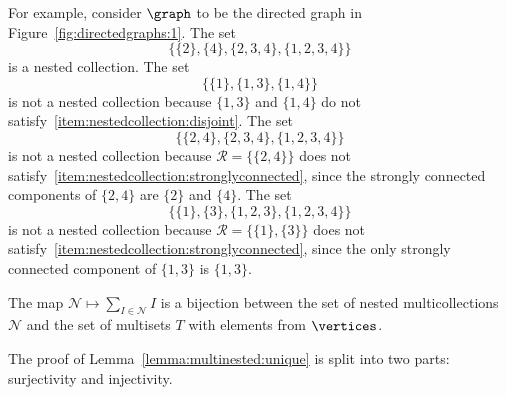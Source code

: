 For example,
consider \(\graph\) to be the directed graph in Figure~\ref{fig:directedgraphs:1}.
The set
\begin{equation*}
    \{
        \{2\},
        \{4\},
        \{2, 3, 4\},
        \{1, 2, 3, 4\}
    \}
\end{equation*} 
is a nested collection.
The set
\begin{equation*}
    \{
        \{1\},
        \{1, 3\},
        \{1, 4\}
    \}
\end{equation*}
is not a nested collection because \(\{1, 3\}\) and \(\{1, 4\}\) do not satisfy~\ref{item:nestedcollection:disjoint}.
The set
\begin{equation*}
    \{
        \{2, 4\},
        \{2, 3, 4\},
        \{1, 2, 3, 4\}
    \}
\end{equation*}
is not a nested collection because \(\mathcal{R} = \{ \{2, 4\} \}\) does not satisfy~\ref{item:nestedcollection:stronglyconnected}, since the strongly connected components of \(\{2, 4\}\) are \(\{2\}\) and \(\{4\}\).
The set
\begin{equation*}
    \{
        \{1\},
        \{3\},
        \{1, 2, 3\},
        \{1, 2, 3, 4\}
    \}
\end{equation*}
is not a nested collection because \(\mathcal{R} = \{ \{1\}, \{3\} \}\) does not satisfy~\ref{item:nestedcollection:stronglyconnected}, since the only strongly connected component of \(\{1, 3\}\) is \(\{1, 3\}\).

\begin{lemm} \label{lemma:multinested:unique}
    The map \(\mathcal{N} \mapsto \sum_{I \in \mathcal{N}} I\) is a bijection between the set of nested multicollections \(\mathcal{N}\) and the set of multisets \(T\) with elements from \(\vertices\).
\end{lemm}

The proof of Lemma~\ref{lemma:multinested:unique} is split into two parts: surjectivity and injectivity.

